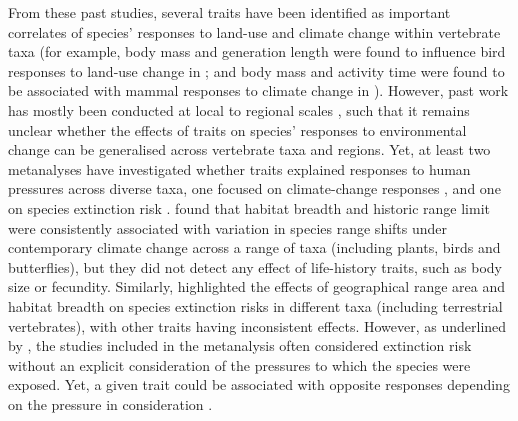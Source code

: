 From these past studies, several traits have been identified as important correlates of species' responses to land-use and climate change within vertebrate taxa (for example, body mass and generation length were found to influence bird responses to land-use change in \citet{Newbold2013}; and body mass and activity time were found to be associated with mammal responses to climate change in \citet{Mccain2014}). However, past work has mostly been conducted at local to regional scales \citep{Hevia2017, Davison2021}, such that it remains unclear whether the effects of traits on species' responses to environmental change can be generalised across vertebrate taxa and regions. Yet, at least two metanalyses have investigated whether traits explained responses to human pressures across diverse taxa, one focused on climate-change responses \citep{MacLean2017}, and one on species extinction risk \citep{Chichorro2019}. \citet{MacLean2017} found that habitat breadth and historic range limit were consistently associated with variation in species range shifts under contemporary climate change across a range of taxa (including plants, birds and butterflies), but they did not detect any effect of life-history traits, such as body size or fecundity. Similarly, \citet{Chichorro2019} highlighted the effects of geographical range area and habitat breadth on species extinction risks in different taxa (including terrestrial vertebrates), with other traits having inconsistent effects. However, as underlined by \citet{Chichorro2019}, the studies included in the metanalysis often considered extinction risk without an explicit consideration of the pressures to which the species were exposed. Yet, a given trait could be associated with opposite responses depending on the pressure in consideration \citep{GonzalezSuarez2013}. 

